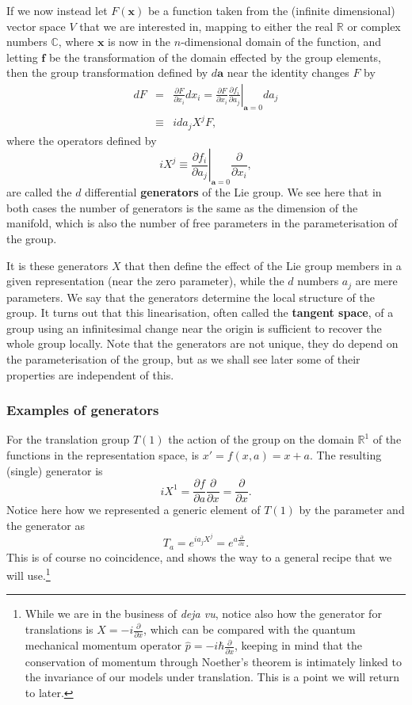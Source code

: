 \documentclass[notes.tex]{subfiles}
\begin{document}
If we now instead let $F(\mathbf x)$ be a function taken from the (infinite dimensional) vector space $V$ that we are interested in, mapping to either the real $\mathbb{R}$ or complex numbers $\mathbb{C}$, where $\mathbf x$ is now in the $n$-dimensional domain of the function, and letting $\mathbf f$ be the transformation of the domain effected by the group elements, then the group transformation defined by $d\mathbf a$ near the identity changes $F$  by
\begin{eqnarray*}
dF &=& \frac{\partial F}{\partial x_i}dx_i = \frac{\partial F}{\partial x_i}\left.\frac{\partial f_i}{\partial a_j}\right|_{\mathbf a=0}da_j\\
&\equiv& i da_j X^j F,
\end{eqnarray*}
where the operators defined by 
\begin{equation}
iX^j \equiv\left.\frac{\partial f_i}{\partial a_j} \right|_{\mathbf a=0}\frac{\partial }{\partial x_i},
\end{equation}
are called the $d$ differential {\bf generators} of the Lie group. We see here that in both cases the number of generators is the same as the dimension of the manifold, which is also the number of free parameters in the parameterisation of the group.

It is these generators $X$ that then define the effect of the Lie group members in a given representation (near the zero parameter), while the $d$ numbers $a_j$ are mere parameters. We say that the generators determine the local structure of the group. It turns out that this linearisation, often called the {\bf tangent space}, of a group using an infinitesimal change near the origin is sufficient to recover the whole group locally. Note that the generators are not unique, they do depend on the parameterisation of the group, but as we shall see later some of their properties are independent of this.


\subsubsection{Examples of generators}
For the translation group $T(1)$ the action of the group on the domain $\mathbb{R}^1$ of the functions in the representation space, is $x'=f(x,a) = x+a$. The resulting (single) generator is
\[ iX^1=\frac{\partial f}{\partial a} \frac{\partial}{\partial x}= \frac{\partial}{\partial x}. \]
Notice here how we represented a generic element of $T(1)$ by the parameter and the generator as
\[ T_a=e^{ia_j X^j}=e^{a \frac{\partial}{\partial x}}. \]
This is of course no coincidence, and shows the way to a general recipe that we will use.\footnote{While we are in the business of {\it deja vu}, notice also how the generator for translations is $X=-i \frac{\partial}{\partial x}$, which can be compared with the quantum mechanical momentum operator $\hat p=-i\hbar \frac{\partial}{\partial x}$, keeping in mind that the conservation of momentum through Noether's theorem is intimately linked to the invariance of our models under translation. This is a point we will return to later.}
\end{document}

